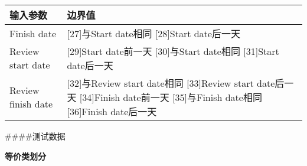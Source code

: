 \documentclass[hyperref, a4paper]{ctexart}
\begin{document}
\begin{longtable}[]{@{}ll@{}}
\toprule
\begin{minipage}[b]{0.13\columnwidth}\raggedright
输入参数\strut
\end{minipage} & \begin{minipage}[b]{0.81\columnwidth}\raggedright
边界值\strut
\end{minipage}\tabularnewline
\midrule
\endhead
\begin{minipage}[t]{0.13\columnwidth}\raggedright
Finish date\strut
\end{minipage} & \begin{minipage}[t]{0.81\columnwidth}\raggedright
{[}27{]}与Start date相同 {[}28{]}Start date后一天\strut
\end{minipage}\tabularnewline
\begin{minipage}[t]{0.13\columnwidth}\raggedright
Review start date\strut
\end{minipage} & \begin{minipage}[t]{0.81\columnwidth}\raggedright
{[}29{]}Start date前一天 {[}30{]}与Start date相同 {[}31{]}Start
date后一天\strut
\end{minipage}\tabularnewline
\begin{minipage}[t]{0.13\columnwidth}\raggedright
Review finish date\strut
\end{minipage} & \begin{minipage}[t]{0.81\columnwidth}\raggedright
{[}32{]}与Review start date相同 {[}33{]}Review start date后一天
{[}34{]}Finish date前一天 {[}35{]}与Finish date相同 {[}36{]}Finish
date后一天\strut
\end{minipage}\tabularnewline
\bottomrule
\end{longtable}

\#\#\#\#测试数据

\textbf{等价类划分}
\end{document}
